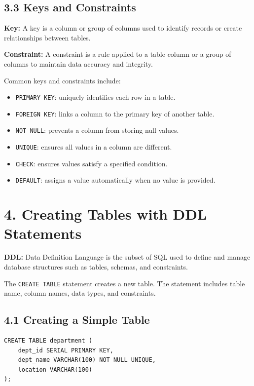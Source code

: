 \documentclass[12pt,a4paper]{article}
\newcommand{\defbox}[2]{%
  \vspace{0.2cm}
  \noindent\colorbox{boxgray}{\parbox{\dimexpr\linewidth-2\fboxsep}{%
    \textbf{#1:} #2
  }}
  \vspace{0.2cm}
}
\begin{document}
\subsection*{3.3 Keys and Constraints}
\defbox{Key}{A key is a column or group of columns used to identify records or create relationships between tables.}

\defbox{Constraint}{A constraint is a rule applied to a table column or a group of columns to maintain data accuracy and integrity.}

\noindent Common keys and constraints include:
\begin{itemize}
    \item \texttt{PRIMARY KEY}: uniquely identifies each row in a table.
    \item \texttt{FOREIGN KEY}: links a column to the primary key of another table.
    \item \texttt{NOT NULL}: prevents a column from storing null values.
    \item \texttt{UNIQUE}: ensures all values in a column are different.
    \item \texttt{CHECK}: ensures values satisfy a specified condition.
    \item \texttt{DEFAULT}: assigns a value automatically when no value is provided.
\end{itemize}

\section*{4. Creating Tables with DDL Statements}
\defbox{DDL}{Data Definition Language is the subset of SQL used to define and manage database structures such as tables, schemas, and constraints.}

The \texttt{CREATE TABLE} statement creates a new table. The statement includes table name, column
names, data types, and constraints.

\subsection*{4.1 Creating a Simple Table}
\begin{verbatim}
CREATE TABLE department (
    dept_id SERIAL PRIMARY KEY,
    dept_name VARCHAR(100) NOT NULL UNIQUE,
    location VARCHAR(100)
);
\end{verbatim}
\end{document}
